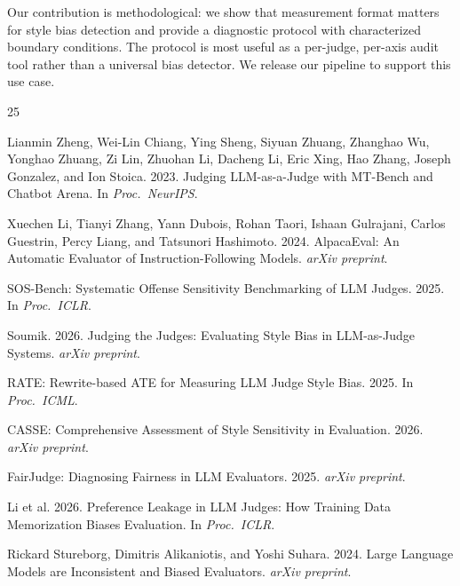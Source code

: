 \documentclass[11pt,a4paper]{article}
\begin{document}
Our contribution is methodological: we show that measurement format matters for style bias detection and provide a diagnostic protocol with characterized boundary conditions.
The protocol is most useful as a per-judge, per-axis audit tool rather than a universal bias detector.
We release our pipeline to support this use case.



\begin{thebibliography}{25}

Lianmin Zheng, Wei-Lin Chiang, Ying Sheng, Siyuan Zhuang, Zhanghao Wu, Yonghao Zhuang, Zi Lin, Zhuohan Li, Dacheng Li, Eric Xing, Hao Zhang, Joseph Gonzalez, and Ion Stoica. 2023.
Judging LLM-as-a-Judge with MT-Bench and Chatbot Arena.
In \textit{Proc.\ NeurIPS}.

Xuechen Li, Tianyi Zhang, Yann Dubois, Rohan Taori, Ishaan Gulrajani, Carlos Guestrin, Percy Liang, and Tatsunori Hashimoto. 2024.
AlpacaEval: An Automatic Evaluator of Instruction-Following Models.
\textit{arXiv preprint}.

SOS-Bench: Systematic Offense Sensitivity Benchmarking of LLM Judges. 2025.
In \textit{Proc.\ ICLR}.

Soumik. 2026.
Judging the Judges: Evaluating Style Bias in LLM-as-Judge Systems.
\textit{arXiv preprint}.

RATE: Rewrite-based ATE for Measuring LLM Judge Style Bias. 2025.
In \textit{Proc.\ ICML}.

CASSE: Comprehensive Assessment of Style Sensitivity in Evaluation. 2026.
\textit{arXiv preprint}.

FairJudge: Diagnosing Fairness in LLM Evaluators. 2025.
\textit{arXiv preprint}.

Li et al. 2026.
Preference Leakage in LLM Judges: How Training Data Memorization Biases Evaluation.
In \textit{Proc.\ ICLR}.

Rickard Stureborg, Dimitris Alikaniotis, and Yoshi Suhara. 2024.
Large Language Models are Inconsistent and Biased Evaluators.
\textit{arXiv preprint}.


\end{thebibliography}
\end{document}
